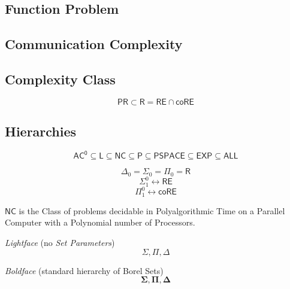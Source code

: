 \documentclass{article}
\begin{document}
\subsection{Function Problem}\label{subsec:function_problem}

\subsection{Communication Complexity}\label{subsec:communication_complexity}

\subsection{Complexity Class}\label{subsec:complexity_class}

\[
    \mathsf{PR} \subset \mathsf{R} = \mathsf{RE} \cap \mathsf{coRE}
\]



\subsection{Hierarchies}\label{subsec:complexity_hierarchy}

\[
    \mathsf{AC^0} \subseteq \mathsf{L} \subseteq \mathsf{NC} \subseteq
    \mathsf{P} \subseteq \mathsf{PSPACE} \subseteq \mathsf{EXP}
    \subseteq \mathsf{ALL}
\]

\[
    \Delta_0 = \Sigma_0 = \Pi_0 = \mathsf{R}
\]\[
    \Sigma_1^0 \leftrightarrow \mathsf{RE}
\]\[
    \Pi_1^0 \leftrightarrow \mathsf{coRE}
\]

\emph{$\mathsf{NC}$} is the Class of problems decidable in
Polyalgorithmic Time on a Parallel Computer with a Polynomial number
of Processors.

\emph{Lightface} (no \emph{Set Parameters}) %
\[
    \Sigma, \Pi, \Delta
\]

\emph{Boldface} (standard hierarchy of Borel Sets)
\[
    \mathbf{\Sigma}, \mathbf{\Pi}, \mathbf{\Delta}
\]
\end{document}
